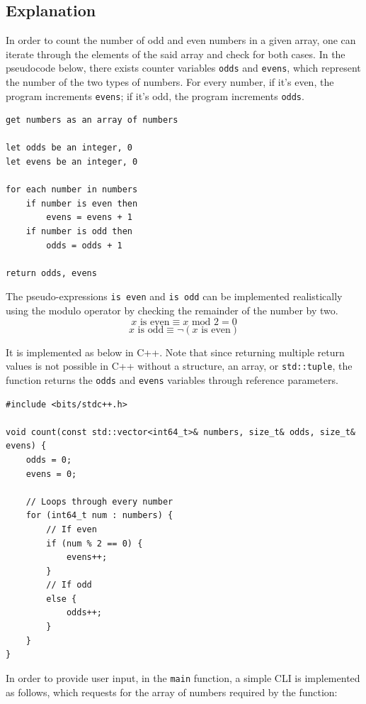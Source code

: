 \documentclass[12pt]{article}
\begin{document}
\subsection{Explanation}

In order to count the number of odd and even numbers in a given array, one can iterate through the elements of the said array and check for both cases. In the pseudocode below, there exists counter variables \texttt{odds} and \texttt{evens}, which represent the number of the two types of numbers. For every number, if it's even, the program increments \texttt{evens}; if it's odd, the program increments \texttt{odds}.

\begin{verbatim}
get numbers as an array of numbers

let odds be an integer, 0
let evens be an integer, 0

for each number in numbers
    if number is even then
        evens = evens + 1
    if number is odd then
        odds = odds + 1

return odds, evens
\end{verbatim}

The pseudo-expressions \texttt{is even} and \texttt{is odd} can be implemented realistically using the modulo operator by checking the remainder of the number by two.
$$x \text{ is even} \equiv x \text{ mod } 2 = 0$$
$$x \text{ is odd} \equiv \neg(x \text{ is even})$$

It is implemented as below in C++. Note that since returning multiple return values is not possible in C++ without a structure, an array, or \texttt{std::tuple}, the function returns the \texttt{odds} and \texttt{evens} variables through reference parameters.

\begin{verbatim}
#include <bits/stdc++.h>

void count(const std::vector<int64_t>& numbers, size_t& odds, size_t& evens) {
    odds = 0;
    evens = 0;

    // Loops through every number
    for (int64_t num : numbers) {
        // If even
        if (num % 2 == 0) {
            evens++;
        }
        // If odd
        else {
            odds++;
        }
    }
}
\end{verbatim}

In order to provide user input, in the \texttt{main} function, a simple CLI is implemented as follows, which requests for the array of numbers required by the function:
\end{document}
